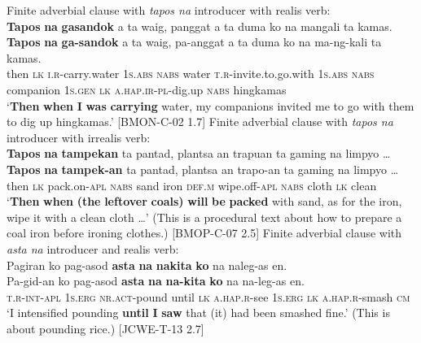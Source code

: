 \ea
Finite adverbial clause with \textit{tapos na} introducer with realis verb: \\
\textbf{Tapos}  \textbf{na}  \textbf{gasandok}  a  ta  waig,  panggat  a  ta duma  ko  na  mangali  ta  kamas. \smallskip\\
\gll \textbf{Tapos}  \textbf{na}  \textbf{ga-sandok}  a  ta  waig,  pa-anggat  a  ta duma  ko  na  ma-ng-kali  ta  kamas. \\
then  \textsc{lk}  \textsc{i.r}-carry.water  1\textsc{s.abs}  \textsc{nabs}  water  \textsc{t.r}-invite.to.go.with  1\textsc{s.abs}  \textsc{nabs}
companion  1\textsc{s.gen}  \textsc{lk}  \textsc{a.hap.ir}-\textsc{pl}-dig.up  \textsc{nabs}  hingkamas \\
\glt `\textbf{Then} \textbf{when} \textbf{I} \textbf{was} \textbf{carrying} water, my companions invited me to go with them to dig up hingkamas.’ [BMON-C-02 1.7]
\z
\ea
Finite adverbial clause with \textit{tapos na} introducer with irrealis verb: \\
\textbf{Tapos}  \textbf{na}  \textbf{tampekan}  ta  pantad,  plantsa  an  trapuan ta  gaming  na  limpyo … \smallskip\\
\gll \textbf{Tapos}  \textbf{na}  \textbf{tampek-an}  ta  pantad,  plantsa  an  trapo-an ta  gaming  na  limpyo … \\
then  \textsc{lk}  pack.on-\textsc{apl}  \textsc{nabs}  sand  iron  \textsc{def.m}  wipe.off-\textsc{apl}
\textsc{nabs}  cloth  \textsc{lk}  clean \\
\glt `\textbf{Then} \textbf{when} \textbf{(the} \textbf{leftover} \textbf{coals)} \textbf{will} \textbf{be} \textbf{packed} with sand, as for the iron, wipe it with a clean cloth …’ (This is a procedural text about how  to  prepare a coal iron before ironing clothes.) [BMOP-C-07 2.5]
\z
\ea
Finite adverbial clause with \textit{asta na} introducer and realis verb: \\
Pagiran  ko  pag-asod  \textbf{asta}  \textbf{na}  \textbf{nakita}  \textbf{ko} na  naleg-as  en. \smallskip\\
\gll Pa-gid-an  ko  pag-asod  \textbf{asta}  \textbf{na}  \textbf{na-kita}  \textbf{ko} na  na-leg-as  en. \\
\textsc{t.r}-\textsc{int}-\textsc{apl}  1\textsc{s.erg}  \textsc{nr.act}-pound  until  \textsc{lk}  \textsc{a.hap.r}-see  1\textsc{s.erg}
\textsc{lk}  \textsc{a.hap.r}-smash  \textsc{cm} \\
\glt `I intensified pounding \textbf{until} \textbf{I} \textbf{saw} that (it) had been smashed fine.’ (This is about pounding rice.) [JCWE-T-13 2.7]
